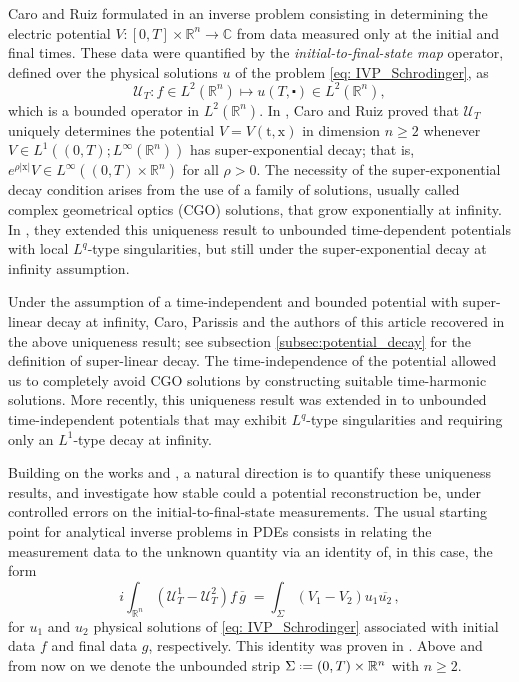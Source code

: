 \documentclass[10pt,a4paper]{amsart}
\theoremstyle{remark}
\theoremstyle{definition}
\newcommand{\R}{\mathbb{R}}
\newcommand{\C}{\mathbb{C}}
\newcommand{\tm}{\mathrm{t}}
\newcommand{\x}{\mathrm{x}}
\newcommand*{\defeq}{\mathrel{\vcenter{\baselineskip0.5ex \lineskiplimit0pt
			\hbox{\scriptsize.}\hbox{\scriptsize.}}}%
	=}
\begin{document}
Caro and Ruiz formulated in \cite{zbMATH07801151} an
inverse problem consisting in determining the electric potential $V:[0,T]\times\R^n\to\C$ from data 
measured only at the initial and final times. 
These data were quantified by the \textit{initial-to-final-state map} operator, defined over the physical solutions $u$ of the problem \eqref{eq: IVP_Schrodinger}, as
\[
\mathcal{U}_T : f \in L^2(\R^n) \mapsto u(T, \centerdot) \in L^2(\R^n),
\]
which is a bounded operator in $L^2 (\R^n)$.
In {\cite{zbMATH07801151}}, Caro and Ruiz proved that $\mathcal{U}_T$ uniquely determines the potential $V = V(\tm, \x)$
in dimension $n \geq 2$ 
whenever $V \in L^1((0, T); L^\infty (\R^n))$ has super-exponential decay; that is,
$ e^{\rho |\x|} V \in L^\infty((0, T) \times \R^n) $ for all $\rho > 0$.
The necessity of the super-exponential decay condition arises from the use of a family of solutions, usually called complex 
geometrical optics (CGO) solutions, that grow exponentially at infinity. 
In \cite{arXiv:2512.04796}, they extended this uniqueness result to unbounded time-dependent potentials with local $L^q$-type singularities, but still under the super-exponential decay at infinity assumption. 

Under the assumption of a time-independent and bounded potential with super-linear decay at infinity, Caro, Parissis and the authors of this article 
recovered in \cite{zbMATH08122191} the above uniqueness result; see subsection \ref{subsec:potential_decay} for the definition of super-linear decay. 
The time-independence of the potential allowed us to completely avoid CGO solutions by constructing suitable time-harmonic solutions. 
More recently, this uniqueness result was extended in \cite{arXiv:2602.12122} to unbounded time-independent potentials that may exhibit $L^q$-type singularities and requiring only an $L^1$-type decay at infinity. 


Building on the works \cite{zbMATH08122191} and \cite{zbMATH07801151}, a natural direction is to quantify these uniqueness results, and investigate how stable could a potential reconstruction be, under controlled errors on the initial-to-final-state measurements. The usual starting point for analytical inverse problems in PDEs consists in relating the measurement data to the unknown quantity via an identity of, in this case, the form
%
\begin{equation}\label{eq: identity}
	i \int_{\R^n} (\mathcal{U}_T^1 - \mathcal{U}_T^2) f \, \overline{g} \; = \int_\Sigma (V_1 - V_2)u_1 \overline{u_2}\,,
\end{equation}
%
for $u_1$ and $u_2$ physical solutions of \eqref{eq: IVP_Schrodinger} associated with initial data $f$ and final data $g$, respectively. This identity was proven in \cite[Proposition 4.1]{zbMATH07801151}. Above and from now on we denote the unbounded strip $\Sigma \defeq (0, T) \times \R^n$ with $n\geq 2$.
\end{document}
